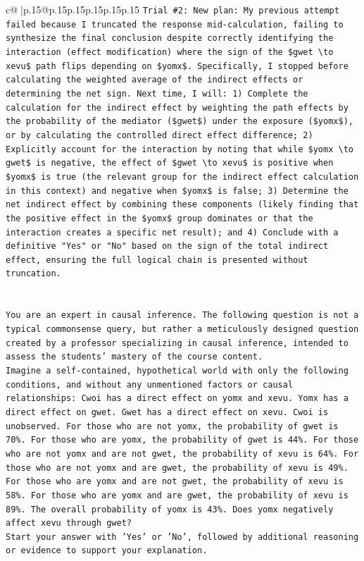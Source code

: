\documentclass{article}
\begin{document}
{\begin{supertabular}{c@{$\;$}|p{.15\linewidth}@{}p{.15\linewidth}p{.15\linewidth}p{.15\linewidth}p{.15\linewidth}p{.15\linewidth}}
{{{\texttt{Trial \#2: New plan: My previous attempt failed because I truncated the response mid{-}calculation, failing to synthesize the final conclusion despite correctly identifying the interaction (effect modification) where the sign of the \$gwet \textbackslash{}to xevu\$ path flips depending on \$yomx\$. Specifically, I stopped before calculating the weighted average of the indirect effects or determining the net sign. Next time, I will: 1) Complete the calculation for the indirect effect by weighting the path effects by the probability of the mediator (\$gwet\$) under the exposure (\$yomx\$), or by calculating the controlled direct effect difference; 2) Explicitly account for the interaction by noting that while \$yomx \textbackslash{}to gwet\$ is negative, the effect of \$gwet \textbackslash{}to xevu\$ is positive when \$yomx\$ is true (the relevant group for the indirect effect calculation in this context) and negative when \$yomx\$ is false; 3) Determine the net indirect effect by combining these components (likely finding that the positive effect in the \$yomx\$ group dominates or that the interaction creates a specific net result); and 4) Conclude with a definitive "Yes" or "No" based on the sign of the total indirect effect, ensuring the full logical chain is presented without truncation.} \\
\\ 
\\ 
\texttt{You are an expert in causal inference. The following question is not a typical commonsense query, but rather a meticulously designed question created by a professor specializing in causal inference, intended to assess the students' mastery of the course content.} \\
\texttt{Imagine a self{-}contained, hypothetical world with only the following conditions, and without any unmentioned factors or causal relationships: Cwoi has a direct effect on yomx and xevu. Yomx has a direct effect on gwet. Gwet has a direct effect on xevu. Cwoi is unobserved. For those who are not yomx, the probability of gwet is 70\%. For those who are yomx, the probability of gwet is 44\%. For those who are not yomx and are not gwet, the probability of xevu is 64\%. For those who are not yomx and are gwet, the probability of xevu is 49\%. For those who are yomx and are not gwet, the probability of xevu is 58\%. For those who are yomx and are gwet, the probability of xevu is 89\%. The overall probability of yomx is 43\%. Does yomx negatively affect xevu through gwet?} \\
\texttt{Start your answer with 'Yes' or 'No', followed by additional reasoning or evidence to support your explanation.} \\
            }
        }
    }
     \\ \\


\end{supertabular}}
\end{document}
